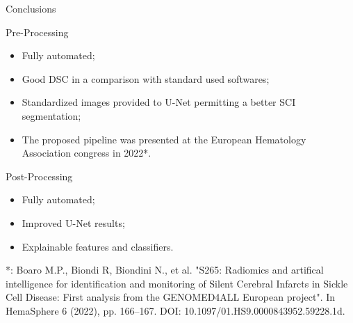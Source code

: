 \documentclass[]{standalone}
\begin{document}
	\begin{frame}{Conclusions}{}
	\vspace{-5pt}
	\begin{block}{Pre-Processing}
	\footnotesize
	\begin{itemize}
		\item Fully automated;
		\item Good DSC in a comparison with standard used softwares;
		\item Standardized images provided to U-Net permitting a better SCI segmentation;
		\item The proposed pipeline was presented at the European Hematology Association congress in 2022*.
	\end{itemize}
	\end{block}
	
	\begin{exampleblock}{Post-Processing}
	\footnotesize
	\begin{itemize}
		\item Fully automated;
		\item Improved U-Net results;
		\item Explainable features and classifiers.
	\end{itemize}
	\end{exampleblock}
	
	\vspace{5pt}
	\tiny
	*: Boaro M.P., Biondi R, Biondini N., et al. "S265: Radiomics and artifical intelligence for identification and monitoring of Silent Cerebral Infarcts in Sickle Cell Disease: First analysis from the GENOMED4ALL European project". In HemaSphere 6 (2022), pp. 166–167. DOI: 10.1097/01.HS9.0000843952.59228.1d.
	\end{frame}
\end{document}
